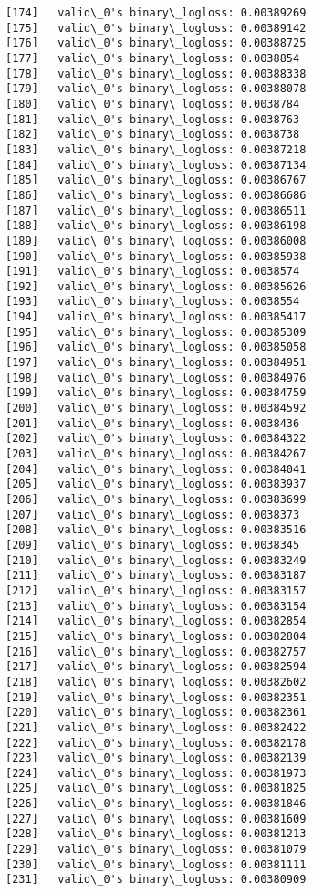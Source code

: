 \documentclass[11pt]{article}
\begin{document}
\begin{Verbatim}[commandchars=\\\{\}]
[174]	valid\_0's binary\_logloss: 0.00389269
[175]	valid\_0's binary\_logloss: 0.00389142
[176]	valid\_0's binary\_logloss: 0.00388725
[177]	valid\_0's binary\_logloss: 0.0038854
[178]	valid\_0's binary\_logloss: 0.00388338
[179]	valid\_0's binary\_logloss: 0.00388078
[180]	valid\_0's binary\_logloss: 0.0038784
[181]	valid\_0's binary\_logloss: 0.0038763
[182]	valid\_0's binary\_logloss: 0.0038738
[183]	valid\_0's binary\_logloss: 0.00387218
[184]	valid\_0's binary\_logloss: 0.00387134
[185]	valid\_0's binary\_logloss: 0.00386767
[186]	valid\_0's binary\_logloss: 0.00386686
[187]	valid\_0's binary\_logloss: 0.00386511
[188]	valid\_0's binary\_logloss: 0.00386198
[189]	valid\_0's binary\_logloss: 0.00386008
[190]	valid\_0's binary\_logloss: 0.00385938
[191]	valid\_0's binary\_logloss: 0.0038574
[192]	valid\_0's binary\_logloss: 0.00385626
[193]	valid\_0's binary\_logloss: 0.0038554
[194]	valid\_0's binary\_logloss: 0.00385417
[195]	valid\_0's binary\_logloss: 0.00385309
[196]	valid\_0's binary\_logloss: 0.00385058
[197]	valid\_0's binary\_logloss: 0.00384951
[198]	valid\_0's binary\_logloss: 0.00384976
[199]	valid\_0's binary\_logloss: 0.00384759
[200]	valid\_0's binary\_logloss: 0.00384592
[201]	valid\_0's binary\_logloss: 0.0038436
[202]	valid\_0's binary\_logloss: 0.00384322
[203]	valid\_0's binary\_logloss: 0.00384267
[204]	valid\_0's binary\_logloss: 0.00384041
[205]	valid\_0's binary\_logloss: 0.00383937
[206]	valid\_0's binary\_logloss: 0.00383699
[207]	valid\_0's binary\_logloss: 0.0038373
[208]	valid\_0's binary\_logloss: 0.00383516
[209]	valid\_0's binary\_logloss: 0.0038345
[210]	valid\_0's binary\_logloss: 0.00383249
[211]	valid\_0's binary\_logloss: 0.00383187
[212]	valid\_0's binary\_logloss: 0.00383157
[213]	valid\_0's binary\_logloss: 0.00383154
[214]	valid\_0's binary\_logloss: 0.00382854
[215]	valid\_0's binary\_logloss: 0.00382804
[216]	valid\_0's binary\_logloss: 0.00382757
[217]	valid\_0's binary\_logloss: 0.00382594
[218]	valid\_0's binary\_logloss: 0.00382602
[219]	valid\_0's binary\_logloss: 0.00382351
[220]	valid\_0's binary\_logloss: 0.00382361
[221]	valid\_0's binary\_logloss: 0.00382422
[222]	valid\_0's binary\_logloss: 0.00382178
[223]	valid\_0's binary\_logloss: 0.00382139
[224]	valid\_0's binary\_logloss: 0.00381973
[225]	valid\_0's binary\_logloss: 0.00381825
[226]	valid\_0's binary\_logloss: 0.00381846
[227]	valid\_0's binary\_logloss: 0.00381609
[228]	valid\_0's binary\_logloss: 0.00381213
[229]	valid\_0's binary\_logloss: 0.00381079
[230]	valid\_0's binary\_logloss: 0.00381111
[231]	valid\_0's binary\_logloss: 0.00380909

\end{Verbatim}
\end{document}
